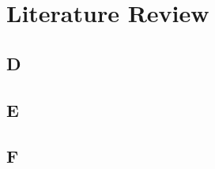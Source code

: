 \chapter{Literature Review}\label{ch:literaturereview}

\section{D}\label{sec:D}


\section{E}\label{sec:E}


\section{F}\label{sec:F}